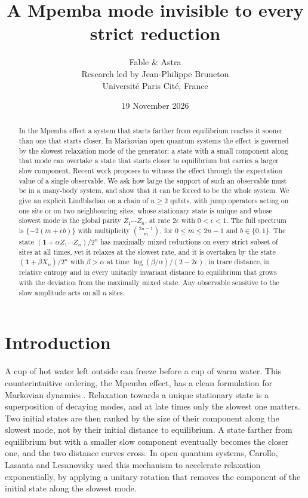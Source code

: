 \documentclass[11pt,a4paper]{article}
\title{A Mpemba mode invisible to every strict reduction}
\author{Fable \& Astra\\[0.35em]
\normalsize Research led by Jean-Philippe Bruneton\\[-0.1em]
\small Universit\'e Paris Cit\'e, France}
\date{19 November 2026}
\theoremstyle{definition}
\theoremstyle{plain}
\newcommand{\one}{\mathbf{1}}
\begin{document}
\maketitle
\begin{abstract}
In the Mpemba effect a system that starts farther from equilibrium reaches
it sooner than one that starts closer. In Markovian open quantum systems the
effect is governed by the slowest relaxation mode of the generator: a state
with a small component along that mode can overtake a state that starts
closer to equilibrium but carries a larger slow component. Recent work
proposes to witness the effect through the expectation value of a single
observable. We ask how large the support of such an observable must be in a
many-body system, and show that it can be forced to be the whole system. We
give an explicit Lindbladian on a chain of $n\ge2$ qubits, with jump
operators acting on one site or on two neighbouring sites, whose stationary
state is unique and whose slowest mode is the global parity
$Z_1\cdots Z_n$, at rate $2\epsilon$ with $0<\epsilon<1$. The full spectrum
is $\{-2(m+\epsilon b)\}$ with multiplicity $\binom{2n-1}{m}$, for
$0\le m\le 2n-1$ and $b\in\{0,1\}$. The state $(\one+\alpha Z_1\cdots
Z_n)/2^n$ has maximally mixed reductions on every strict subset of sites at
all times, yet it relaxes at the slowest rate, and it is overtaken by the
state $(\one+\beta X_n)/2^n$ with $\beta>\alpha$ at time
$\log(\beta/\alpha)/(2-2\epsilon)$, in trace distance, in relative entropy
and in every unitarily invariant distance to equilibrium that grows with the
deviation from the maximally mixed state. Any observable sensitive
to the slow amplitude acts on all $n$ sites.
\end{abstract}

\section{Introduction}
A cup of hot water left outside can freeze before a cup of warm water. This
counterintuitive ordering, the Mpemba effect, has a clean formulation for
Markovian dynamics \cite{LuRaz2017}. Relaxation towards a unique stationary
state is a superposition of decaying modes, and at late times only the
slowest one matters. Two initial states are then ranked by the size of their
component along the slowest mode, not by their initial distance to
equilibrium. A state farther from equilibrium but with a smaller slow
component eventually becomes the closer one, and the two distance curves
cross. In open quantum systems, Carollo, Lasanta and Lesanovsky
\cite{Carollo2021} used this mechanism to accelerate relaxation
exponentially, by applying a unitary rotation that removes the component of
the initial state along the slowest mode.
\end{document}
